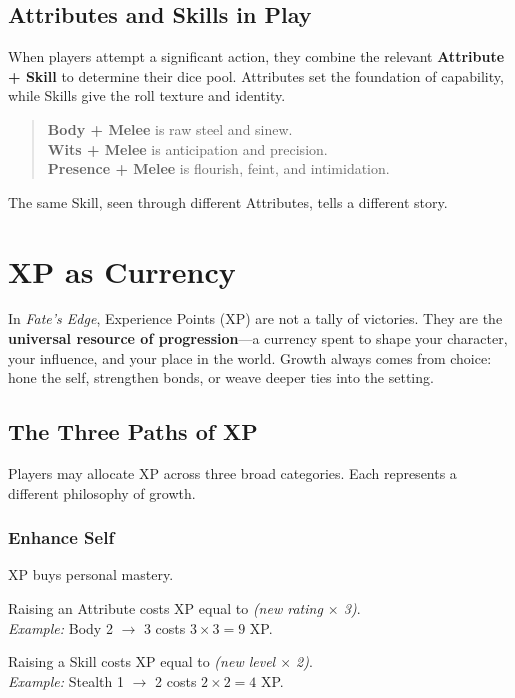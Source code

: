 \documentclass[12pt]{book}
\begin{document}
\section{Attributes and Skills in Play}
When players attempt a significant action, they combine the relevant \textbf{Attribute + Skill} to determine their dice pool. Attributes set the foundation of capability, while Skills give the roll texture and identity.
\begin{quote}
\textbf{Body + Melee} is raw steel and sinew.\\
\textbf{Wits + Melee} is anticipation and precision.\\
\textbf{Presence + Melee} is flourish, feint, and intimidation.
\end{quote}
The same Skill, seen through different Attributes, tells a different story.

\chapter{XP as Currency}
In \textit{Fate’s Edge}, Experience Points (XP) are not a tally of victories. They are the \textbf{universal resource of progression}—a currency spent to shape your character, your influence, and your place in the world. Growth always comes from choice: hone the self, strengthen bonds, or weave deeper ties into the setting.

\section{The Three Paths of XP}
Players may allocate XP across three broad categories. Each represents a different philosophy of growth.

\subsection{Enhance Self}
XP buys personal mastery.
\begin{description}[leftmargin=2cm]
  \item[Attributes] Raising an Attribute costs XP equal to \emph{(new rating $\times$ 3)}.\\
  \emph{Example:} Body 2 $\rightarrow$ 3 costs $3\times 3=9$ XP.
  \item[Skills] Raising a Skill costs XP equal to \emph{(new level $\times$ 2)}.\\
  \emph{Example:} Stealth 1 $\rightarrow$ 2 costs $2\times 2=4$ XP.
\end{description}
\end{document}
